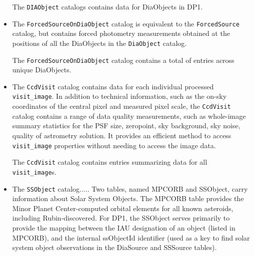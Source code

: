 \begin{itemize}
The \texttt{DIAObject} catalogs contains data for \ndiaobjects DiaObjects in DP1.


\item The \texttt{ForcedSourceOnDiaObject} catalog is equivalent to the \texttt{ForcedSource} catalog, but contains forced photometry measurements obtained at the positions of all the DiaObjects in the \texttt{DiaObject} catalog.

The \texttt{ForcedSourceOnDiaObject} catalog  contains a total of \ndiaforcedsources entries across \ndiaforcedobjects unique DiaObjects.


\item The \texttt{CcdVisit} catalog contains data for each individual processed \texttt{visit\_image}.
In addition to technical information, such as the on-sky coordinates of the central pixel and measured pixel scale, the \texttt{CcdVisit} catalog contains a range of data quality measurements, such as whole-image summary statistics for the PSF size, zeropoint, sky background, sky noise, quality of astrometry solution.
It provides an efficient method to access  \texttt{visit\_image} properties without needing to access the image data.

The \texttt{CcdVisit} catalog contains entries summarizing data for all \nvisitdetectorsummaries \texttt{visit\_image}s.

\item The \texttt{SSObject} catalog..... Two tables, named MPCORB and SSObject, carry information about Solar System Objects. The MPCORB table provides the Minor Planet Center-computed orbital elements for all known asteroids, including Rubin-discovered. For DP1, the SSObject serves primarily to provide the mapping between the IAU designation of an object (listed in MPCORB), and the internal ssObjectId identifier (used as a key to find solar system object observations in the DiaSource and SSSource tables).


\end{itemize}
